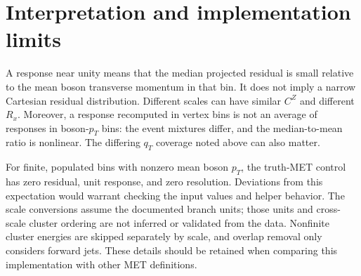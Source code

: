 \documentclass[11pt,a4paper]{article}
\begin{document}
\section{Interpretation and implementation limits}
A response near unity means that the median projected residual is small
relative to the mean boson transverse momentum in that bin. It does not
imply a narrow Cartesian residual distribution. Different scales can have
similar $C^Z$ and different $R_x$.
Moreover, a response recomputed in vertex bins is not an average of responses
in boson-$p_T$ bins: the event mixtures differ, and the median-to-mean ratio
is nonlinear. The differing $q_T$ coverage noted above can also matter.

For finite, populated bins with nonzero mean boson $p_T$, the truth-MET
control has zero residual, unit response, and zero resolution. Deviations
from this expectation would warrant checking the input values and helper
behavior.
The scale conversions assume the documented branch units; those units and
cross-scale cluster ordering are not inferred or validated from the data.
Nonfinite cluster energies are skipped separately by scale, and overlap
removal only considers forward jets. These details should be retained when
comparing this implementation with other MET definitions.
\end{document}
